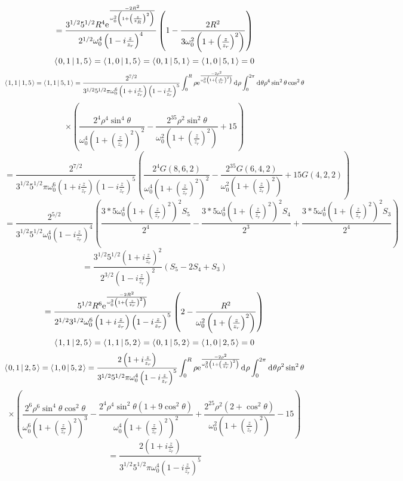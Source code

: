 \documentclass[11pt]{amsart}
\makeatletter
\newcommand{\e}{{\rm e}}				%
\newcommand{\msp}[1]{\mspace{#1mu}}		%
\newcommand{\0}{\varnothing}		%
\newcommand{\dd}{\msp{1} {\rm{d}} \msp{1}}	%
\newcommand{\brac}[2]{\left\langle\msp{2} #1\left\lvert \msp{3.5} #2 \right.\right\rangle}	%
\newcommand{\1}{!}
\newcommand{\2}{@}
\newcommand{\3}{\#}
\newcommand{\4}{\$}
\newcommand{\5}{\%}
\newcommand{\6}{$^\wedge$}
\newcommand{\7}{\&}
\newcommand{\8}{*}
\newcommand{\9}{(}
\makeatother
\begin{document}
\[
=\frac{3^{1/2}5^{1/2}R^4\e^{\frac{-2R^2}{\omega_0^2\left(1+\left(\frac{z}{z_R}\right)^2\right)}}}{2^{1/2}\omega_0^4\left(1-i\frac{z}{z_r}\right)^4}\left(1-\frac{2R^2}{3\omega_0^2\left(1+\left(\frac{z}{z_r}\right)^2\right)}\right)
\]
\[
\brac{0,1}{1,5} = \brac{1,0}{1,5} = \brac{0,1}{5,1} = \brac{1,0}{5,1} = 0
\]
\[
\brac{1,1}{1,5} = \brac{1,1}{5,1} =\frac{2^{7/2}}{3^{1/2}5^{1/2}\pi\omega_0^6\left(1+i\frac{z}{z_r}\right)\left(1-i\frac{z}{z_r}\right)^5}\int_0^R\rho \e^{\frac{-2\rho^2}{\omega_0^2\left(1+\left(\frac{z}{z_r}\right)^2\right)}}\dd  \rho \int_0^{2\pi}\dd \theta\rho^4\sin^2\theta\cos^2\theta
\]
\[
\times\left(\frac{2^4\rho^4\sin^4\theta}{\omega_0^4\left(1+\left(\frac{z}{z_r}\right)^2\right)^2}-\frac{2^35\rho^2\sin^2\theta}{\omega_0^2\left(1+\left(\frac{z}{z_r}\right)^2\right)}+15\right)
\]
\[
=\frac{2^{7/2}}{3^{1/2}5^{1/2}\pi\omega_0^6\left(1+i\frac{z}{z_r}\right)\left(1-i\frac{z}{z_r}\right)^5}\left(\frac{2^4G(8,6,2)}{\omega_0^4\left(1+\left(\frac{z}{z_r}\right)^2\right)^2}-\frac{2^35G(6,4,2)}{\omega_0^2\left(1+\left(\frac{z}{z_r}\right)^2\right)}+15G(4,2,2)\right)
\]
\[
=\frac{2^{5/2}}{3^{1/2}5^{1/2}\omega_0^4\left(1-i\frac{z}{z_r}\right)^4}\left(\frac{3*5\omega_0^4\left(1+\left(\frac{z}{z_r}\right)^2\right)^2S_5}{2^4}-\frac{3*5\omega_0^4\left(1+\left(\frac{z}{z_r}\right)^2\right)^2S_4}{2^3}+\frac{3*5\omega_0^4\left(1+\left(\frac{z}{z_r}\right)^2\right)^2S_3}{2^4}\right)
\]
\[
=\frac{3^{1/2}5^{1/2}\left(1+i\frac{z}{z_r}\right)^2}{2^{3/2}\left(1-i\frac{z}{z_r}\right)^2}\left(S_5-2S_4+S_3\right)
\]
\[
=\frac{5^{1/2}R^6\e^{\frac{-2R^2}{\omega_0^2\left(1+\left(\frac{z}{z_r}\right)^2\right)}}}{2^{1/2}3^{1/2}\omega_0^6\left(1+i\frac{z}{z_r}\right)\left(1-i\frac{z}{z_r}\right)^5}\left(2-\frac{R^2}{\omega_0^2\left(1+\left(\frac{z}{z_r}\right)^2\right)}\right)
\]
\[
\brac{1,1}{2,5} = \brac{1,1}{5,2} = \brac{0,1}{5,2} = \brac{1,0}{2,5} = 0
\]
\[
\brac{0,1}{2,5} = \brac{1,0}{5,2} = \frac{2\left(1+i\frac{z}{z_r}\right)}{3^{1/2}5^{1/2}\pi\omega_0^4\left(1-i\frac{z}{z_r}\right)^5}\int_0^R\rho \e^{\frac{-2\rho^2}{\omega_0^2\left(1+\left(\frac{z}{z_r}\right)^2\right)}}\dd \rho \int_0^{2\pi}\dd \theta \rho^2\sin^2\theta 
\]
\[
\times\left(\frac{2^6\rho^6\sin^4\theta\cos^2\theta}{\omega_0^6\left(1+\left(\frac{z}{z_r}\right)^2\right)^3}-\frac{2^4\rho^4\sin^2\theta\left(1+9\cos^2\theta\right)}{\omega_0^4\left(1+\left(\frac{z}{z_r}\right)^2\right)^2}+\frac{2^25\rho^2\left(2+\cos^2\theta\right)}{\omega_0^2\left(1+\left(\frac{z}{z_r}\right)^2\right)}-15\right)
\]
\[
=\frac{2\left(1+i\frac{z}{z_r}\right)}{3^{1/2}5^{1/2}\pi \omega_0^4\left(1-i\frac{z}{z_r}\right)^5}
\]
\end{document}

